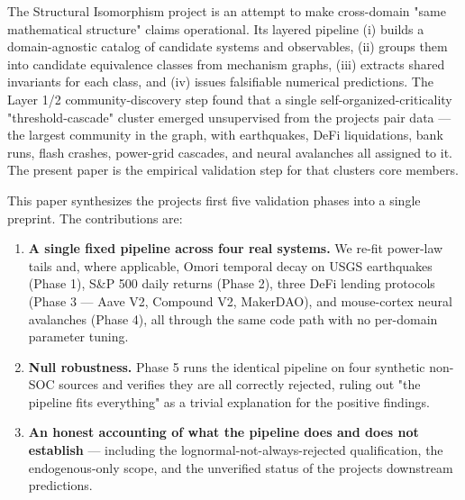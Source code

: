 \documentclass[
  11pt]{article}
\providecommand{\tightlist}{%
  \setlength{\itemsep}{0pt}\setlength{\parskip}{0pt}}
\begin{document}
The Structural Isomorphism project is an attempt to make cross-domain
"same mathematical structure" claims operational. Its layered pipeline
(i) builds a domain-agnostic catalog of candidate systems and
observables, (ii) groups them into candidate equivalence classes from
mechanism graphs, (iii) extracts shared invariants for each class, and
(iv) issues falsifiable numerical predictions. The Layer 1/2
community-discovery step found that a single self-organized-criticality
"threshold-cascade" cluster emerged unsupervised from the
project\textquotesingle s pair data --- the largest community in the
graph, with earthquakes, DeFi liquidations, bank runs, flash crashes,
power-grid cascades, and neural avalanches all assigned to it. The
present paper is the empirical validation step for that
cluster\textquotesingle s core members.

This paper synthesizes the project\textquotesingle s first five
validation phases into a single preprint. The contributions are:

\begin{enumerate}
\def\labelenumi{\arabic{enumi}.}
\tightlist
\item
  \textbf{A single fixed pipeline across four real systems.} We re-fit
  power-law tails and, where applicable, Omori temporal decay on USGS
  earthquakes (Phase 1), S\&P 500 daily returns (Phase 2), three DeFi
  lending protocols (Phase 3 --- Aave V2, Compound V2, MakerDAO), and
  mouse-cortex neural avalanches (Phase 4), all through the same code
  path with no per-domain parameter tuning.
\item
  \textbf{Null robustness.} Phase 5 runs the identical pipeline on four
  synthetic non-SOC sources and verifies they are all correctly
  rejected, ruling out "the pipeline fits everything" as a trivial
  explanation for the positive findings.
\item
  \textbf{An honest accounting of what the pipeline does and does not
  establish} --- including the lognormal-not-always-rejected
  qualification, the endogenous-only scope, and the unverified status of
  the project\textquotesingle s downstream predictions.
\end{enumerate}
\end{document}
